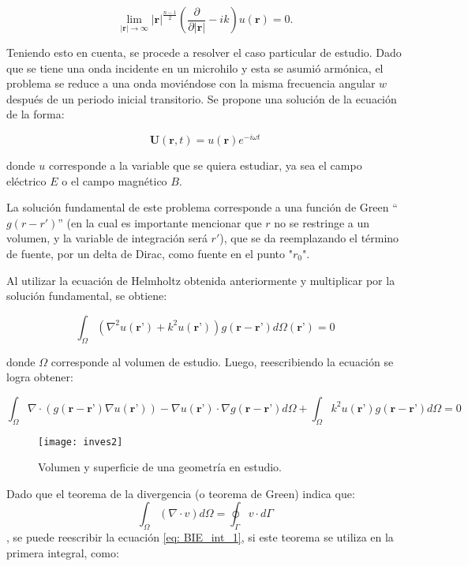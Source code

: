 \documentclass[12pt,letterpaper]{report}
\numberwithin{equation}{section}
\begin{document}
\begin{equation}
\lim\limits_{|\textbf{r}|\rightarrow\infty}|\textbf{r}|^{\frac{n-1}{2}}\left(\frac{\partial}{\partial|\textbf{r}|}-ik\right)u(\textbf{r})=0.
\label{eq:Sommerfeld radiation condition}
\end{equation} 

Teniendo esto en cuenta, se procede a resolver el caso particular de estudio. Dado que se tiene una onda incidente en un microhilo y esta se asumió armónica, el problema se reduce a una onda moviéndose con la misma frecuencia angular $w$ después de un periodo inicial transitorio. Se propone una solución de la ecuación de la forma:

$$\textbf{U}(\textbf{r},t) = u(\textbf{r})e^{-i\omega t}$$ 

\noindent donde $u$ corresponde a la variable que se quiera estudiar, ya sea el campo eléctrico $E$ o el campo magnético $B$.

La solución fundamental de este problema corresponde a una función de Green ``$g(r-r')$'' (en la cual es importante mencionar que $r$ no se restringe a un volumen, y la variable de integración será $r'$), que se da reemplazando el término de fuente, por un delta de Dirac, como fuente en el punto "$r_{0}$".

Al utilizar la ecuación de Helmholtz obtenida anteriormente y multiplicar por la solución fundamental, se obtiene:

\begin{equation}
\int_{\Omega}(\nabla^2u(\textbf{r'})+k^2u(\textbf{r'}))g(\textbf{r}-\textbf{r'})d\varOmega(\textbf{r'})=0
\label{eq:Helmholtz*Green}
\end{equation}

\noindent donde $\Omega$ corresponde al volumen de estudio. Luego, reescribiendo la ecuación se logra obtener:

\begin{equation}
\int_{\Omega}\nabla\cdot (g(\textbf{r}-\textbf{r'})\nabla u(\textbf{r'}))-\nabla u(\textbf{r'})\cdot\nabla g(\textbf{r}-\textbf{r'}) d\varOmega+\int_{\Omega}k^2u(\textbf{r'})g(\textbf{r}-\textbf{r'})d\varOmega=0
\label{eq: BIE_int_1}
\end{equation}

\begin{figure}[H]
	\centering
	\texttt{[image: inves2]}
	\caption{Volumen y superficie de una geometría en estudio. \cite{paperBEMpp}}
\end{figure}


Dado que el teorema de la divergencia (o teorema de Green) indica que: $$\int_{\Omega}(\nabla\cdot v)d\varOmega=\oint_{\Gamma}v\cdot d\varGamma$$, 
\noindent se puede reescribir la ecuación \ref{eq: BIE_int_1}, si este teorema se utiliza en la primera integral, como:
\end{document}
